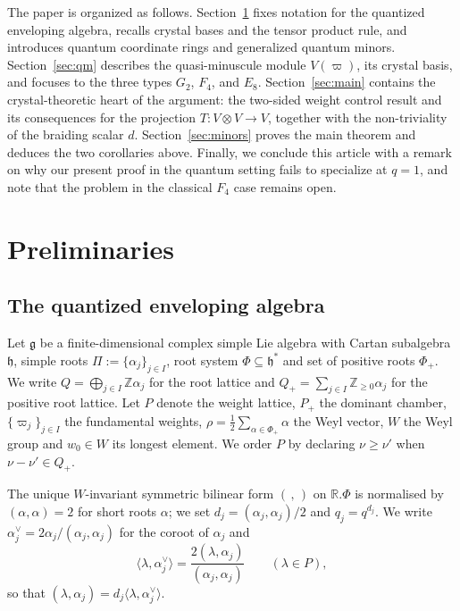 \documentclass[12pt]{amsart}
\theoremstyle{plain}
\theoremstyle{remark}
\newcommand{\g}{\mathfrak{g}}
\newcommand{\ot}{\otimes}
\newcommand{\vp}{\varpi}
\newcommand{\Qp}{Q_{+}}
\begin{document}
The paper is organized as follows. Section~\ref{sec:prelim} fixes notation for the
quantized enveloping algebra, recalls crystal bases and the tensor product rule, and
introduces quantum coordinate rings and generalized quantum minors.
Section~\ref{sec:qm} describes the quasi-minuscule module $V(\vp)$, its crystal basis,
and focuses to the three types $G_2$, $F_4$, and $E_8$. Section~\ref{sec:main}
contains the crystal-theoretic heart of the argument: the two-sided weight control result and
its consequences for the projection $T\colon V\ot V\to V$, together with the
non-triviality of the braiding scalar $d$. Section~\ref{sec:minors} proves the main
theorem and deduces the two corollaries above. Finally, we conclude this article with a remark on why our present proof in the quantum setting fails to specialize at $q=1$, and note that the problem in the classical $F_4$ case remains open. 

\section{Preliminaries}\label{sec:prelim}

\subsection{The quantized enveloping algebra}\label{ss:qea}

Let $\g$ be a finite-dimensional complex simple Lie algebra with Cartan subalgebra
$\mathfrak h$, simple roots $\Pi:=\{\alpha_j\}_{j\in I}$, root system $\Phi\subseteq\mathfrak
h^*$ and set of positive roots $\Phi_+$. We write $Q=\bigoplus_{j\in I}\mathbb
Z\alpha_j$ for the root lattice and $\Qp=\sum_{j\in I}\mathbb Z_{\ge0}\alpha_j$ for the
positive root lattice. Let $P$ denote the weight lattice, $P_+$ the dominant chamber,
$\{\vp_j\}_{j\in I}$ the fundamental weights, $\rho=\tfrac12\sum_{\alpha\in\Phi_+}\alpha$
the Weyl vector, $W$ the Weyl group and $w_0\in W$ its longest element. We order $P$ by declaring $\nu\ge\nu'$ when
$\nu-\nu'\in\Qp$.

The unique $W$-invariant symmetric bilinear form $(\,,\,)$ on $\mathbb{R}.\Phi$ is normalised by
$(\alpha,\alpha)=2$ for short roots $\alpha$; we set $d_j=(\alpha_j,\alpha_j)/2$ and
$q_j=q^{d_j}$. We write $\alpha_j^\vee=2\alpha_j/(\alpha_j,\alpha_j)$ for the coroot of
$\alpha_j$ and
\[
\langle\lambda,\alpha_j^\vee\rangle
=\frac{2(\lambda,\alpha_j)}{(\alpha_j,\alpha_j)}\qquad(\lambda\in P),
\]
so that $(\lambda,\alpha_j)=d_j\langle\lambda,\alpha_j^\vee\rangle$.
\end{document}
